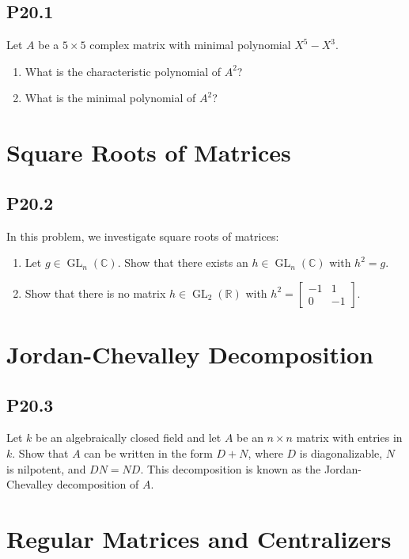 \documentclass[lang=cn,11pt]{template}
\begin{document}
\subsection*{P20.1} Let \( A \) be a \( 5 \times 5 \) complex matrix with minimal polynomial \( X^5 - X^3 \).
\begin{enumerate}
    \item What is the characteristic polynomial of \( A^2 \)?
    \item What is the minimal polynomial of \( A^2 \)?
\end{enumerate}

\section{Square Roots of Matrices}

\subsection*{P20.2} In this problem, we investigate square roots of matrices:
\begin{enumerate}
    \item Let \( g \in \operatorname{GL}_n(\mathbb{C}) \). Show that there exists an \( h \in \operatorname{GL}_n(\mathbb{C}) \) with \( h^2 = g \).
    \item Show that there is no matrix \( h \in \operatorname{GL}_2(\mathbb{R}) \) with \( h^2 = \begin{bmatrix} -1 & 1 \\ 0 & -1 \end{bmatrix} \).
\end{enumerate}

\section{Jordan-Chevalley Decomposition}

\subsection*{P20.3} Let \( k \) be an algebraically closed field and let \( A \) be an \( n \times n \) matrix with entries in \( k \). Show that \( A \) can be written in the form \( D + N \), where \( D \) is diagonalizable, \( N \) is nilpotent, and \( DN = ND \). This decomposition is known as the Jordan-Chevalley decomposition of \( A \).

\section{Regular Matrices and Centralizers}
\end{document}
